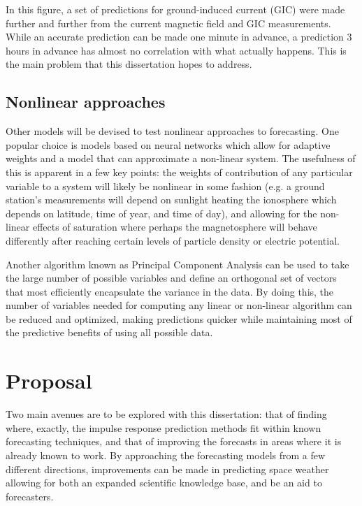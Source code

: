 \documentclass[10pt]{article}
\begin{document}
In this figure, a set of predictions for ground-induced current (GIC) were made further and further from the current magnetic field and GIC measurements. While an accurate prediction can be made one minute in advance, a prediction 3 hours in advance has almost no correlation with what actually happens. This is the main problem that this dissertation hopes to address.


\subsection{Nonlinear approaches}
Other models will be devised to test nonlinear approaches to forecasting. One popular choice is models based on neural networks \citep{NNARMA,ANNforecast} which allow for adaptive weights and a model that can approximate a non-linear system. The usefulness of this is apparent in a few key points: the weights of contribution of any particular variable to a system will likely be nonlinear in some fashion (e.g. a ground station's measurements will depend on sunlight heating the ionosphere which depends on latitude, time of year, and time of day), and allowing for the non-linear effects of saturation where perhaps the magnetosphere will behave differently after reaching certain levels of particle density or electric potential.

Another algorithm known as Principal Component Analysis can be used to take the large number of possible variables and define an orthogonal set of vectors that most efficiently encapsulate the variance in the data. By doing this, the number of variables needed for computing any linear or non-linear algorithm can be reduced and optimized, making predictions quicker while maintaining most of the predictive benefits of using all possible data.


\section{Proposal}

Two main avenues are to be explored with this dissertation: that of finding where, exactly, the impulse response prediction methods fit within known forecasting techniques, and that of improving the forecasts in areas where it is already known to work. By approaching the forecasting models from a few different directions, improvements can be made in predicting space weather allowing for both an expanded scientific knowledge base, and be an aid to forecasters.
\end{document}
